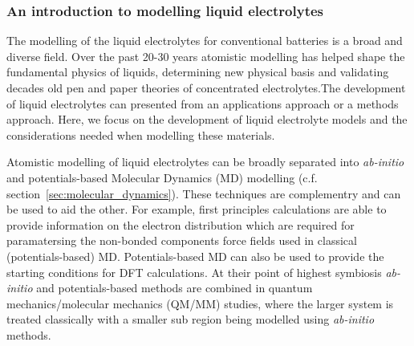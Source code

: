 \documentclass[../main.tex]{subfiles}
\begin{document}


\subsubsection{An introduction to modelling liquid electrolytes}
The modelling of the liquid electrolytes for conventional batteries is a broad and diverse field. Over the past 20-30 years atomistic modelling has helped shape the fundamental physics of liquids, determining new physical basis and validating decades old pen and paper theories of concentrated electrolytes.The development of liquid electrolytes can presented from an applications approach or a methods approach. Here, we focus on the development of liquid electrolyte models and the considerations needed when modelling these materials.

Atomistic modelling of liquid electrolytes can be broadly separated into \textit{ab-initio} and potentials-based Molecular Dynamics (MD) modelling (c.f. section~\ref{sec:molecular_dynamics}). These techniques are complementry and can be used to aid the other. For example, first principles calculations are able to provide information on the electron distribution which are required for paramatersing the non-bonded components force fields used in classical (potentials-based) MD. Potentials-based MD can also be used to provide the starting conditions for DFT calculations. At their point of highest symbiosis \textit{ab-initio} and potentials-based methods are combined in quantum mechanics/molecular mechanics (QM/MM) studies, where the larger system is treated classically with a smaller sub region being modelled using \textit{ab-initio} methods.
\end{document}
